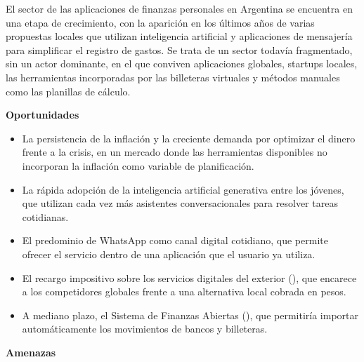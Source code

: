El sector de las aplicaciones de finanzas personales en Argentina se
encuentra en una etapa de crecimiento, con la aparición en los últimos
años de varias propuestas locales que utilizan inteligencia artificial y
aplicaciones de mensajería para simplificar el registro de gastos. Se
trata de un sector todavía fragmentado, sin un actor dominante, en el
que conviven aplicaciones globales, startups locales, las herramientas
incorporadas por las billeteras virtuales y métodos manuales como las
planillas de cálculo.

\textbf{Oportunidades}

\begin{itemize}
\tightlist
\item
  La persistencia de la inflación y la creciente demanda por optimizar
  el dinero frente a la crisis, en un mercado donde las herramientas
  disponibles no incorporan la inflación como variable de planificación.
\item
  La rápida adopción de la inteligencia artificial generativa entre los
  jóvenes, que utilizan cada vez más asistentes conversacionales para
  resolver tareas cotidianas.
\item
  El predominio de WhatsApp como canal digital cotidiano, que permite
  ofrecer el servicio dentro de una aplicación que el usuario ya
  utiliza.
\item
  El recargo impositivo sobre los servicios digitales del exterior
  (), que encarece a
  los competidores globales frente a una alternativa local cobrada en
  pesos.
\item
  A mediano plazo, el Sistema de Finanzas Abiertas
  (), que permitiría
  importar automáticamente los movimientos de bancos y billeteras.
\end{itemize}

\textbf{Amenazas}

